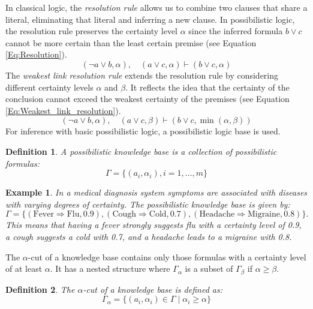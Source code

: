 \documentclass[seminar,english,m]{AIGpaper}
\newtheorem{definition}{Definition}
\newtheorem{example}{Example}
\begin{document}
In classical logic, the \textit{resolution rule} allows us to combine two clauses that share a literal, eliminating that literal and inferring a new clause. In possibilistic logic, the resolution rule preserves the certainty level \( \alpha \) since the inferred formula \( b \lor c \) cannot be more certain than the least certain premise (see Equation \ref{Eq:Resolution}).
\begin{equation}\label{Eq:Resolution}
	(\neg a \lor b, \alpha), \quad (a \lor c, \alpha) \vdash (b \lor c, \alpha)
\end{equation}
The \textit{weakest link resolution rule} extends the resolution rule by considering different certainty levels \( \alpha \) and \( \beta \). It reflects the idea that the certainty of the conclusion cannot exceed the weakest certainty of the premises (see Equation \ref{Eq:Weakest_link_resolution}).
\begin{equation}\label{Eq:Weakest_link_resolution}
	(\neg a \lor b, \alpha), \quad (a \lor c, \beta) \vdash (b \lor c, \min(\alpha, \beta))
\end{equation}
For inference with basic possibilistic logic, a possibilistic logic base is used.  
\begin{definition}  
	A possibilistic knowledge base is a collection of possibilistic formulas:  
	\begin{equation}\label{Eq:Knowledge_base}  
		\Gamma = \{(a_i, \alpha_i), i = 1, \dots, m\}  
	\end{equation}  
\end{definition}  
\begin{example} \label{example:medical}  
	In a medical diagnosis system symptoms are associated with diseases with varying degrees of certainty. The possibilistic knowledge base is given by:  
	\[
	\Gamma = \{ (\text{Fever} \Rightarrow \text{Flu}, 0.9), (\text{Cough} \Rightarrow \text{Cold}, 0.7), (\text{Headache} \Rightarrow \text{Migraine}, 0.8) \}.
	\]  
	This means that having a fever strongly suggests flu with a certainty level of 0.9, a cough suggests a cold with 0.7, and a headache leads to a migraine with 0.8.  
\end{example}
The \( \alpha \)-cut of a knowledge base contains only those formulas with a certainty level of at least \( \alpha \). It has a nested structure where \( \Gamma_\alpha \) is a subset of \( \Gamma_\beta \) if \( \alpha \geq \beta \).
\begin{definition}  
	The \( \alpha \)-cut of a knowledge base is defined as:  
	\begin{equation}\label{Eq:Knowledge_base_cut}  
		\Gamma_\alpha = \{(a_i, \alpha_i) \in \Gamma \mid \alpha_i \geq \alpha\}  
	\end{equation}  
\end{definition}
\end{document}
